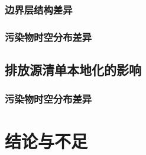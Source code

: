 \documentclass[a4paper]{article}
\begin{document}
\subsubsection{边界层结构差异}
\subsubsection{污染物时空分布差异}
\subsection{排放源清单本地化的影响}
\subsubsection{污染物时空分布差异}
\section{结论与不足}
\end{document}
